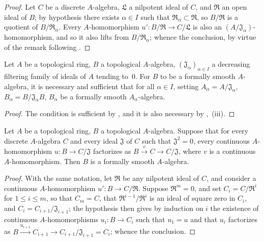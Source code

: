 \begin{proof}
Let $C$ be a discrete $A$-algebra, $\mathfrak{L}$ a nilpotent ideal of $C$, and $\mathfrak{R}$ an open ideal of $B$;
by hypothesis there exists $\alpha\in I$ such that $\mathfrak{R}_\alpha\subset\mathfrak{R}$, so $B/\mathfrak{R}$ is a quotient of $B/\mathfrak{R}_\alpha$.
Every $A$-homomorphism $u':B/\mathfrak{R}\to C/\mathfrak{L}$ is also an $(A/\mathfrak{J}_\alpha)$-homomorphism, and so it also lifts from $B/\mathfrak{R}_\alpha$;
whence the conclusion, by virtue of the remark following .
\end{proof}

\begin{corollary}[19.4.2]
\label{0.19.4.2}
Let $A$ be a topological ring, $B$ a topological $A$-algebra, $(\mathfrak{J}_\alpha)_{\alpha\in I}$ a decreasing filtering family of ideals of $A$ tending to~$0$.
For $B$ to be a formally smooth $A$-algebra, it is necessary and sufficient that for all $\alpha\in I$, setting $A_\alpha=A/\mathfrak{J}_\alpha$, $B_\alpha=B/\mathfrak{J}_\alpha B$, $B_\alpha$ be a formally smooth $A_\alpha$-algebra.
\end{corollary}

\begin{proof}
The condition is sufficient by , and it is also necessary by ,~(iii).
\end{proof}

\begin{proposition}[19.4.3]
\label{0.19.4.3}
Let $A$ be a topological ring, $B$ a topological $A$-algebra.
Suppose that for every discrete $A$-algebra $C$ and every ideal $\mathfrak{J}$ of $C$ such that $\mathfrak{J}^2=0$, every continuous $A$-homomorphism $u:B\to C/\mathfrak{J}$ factorizes as $B\xrightarrow{v}C\to C/\mathfrak{J}$, where $v$ is a continuous $A$-homomorphism.
Then $B$ is a formally smooth $A$-algebra.
\end{proposition}

\begin{proof}
With the same notation, let $\mathfrak{R}$ be any nilpotent ideal of $C$,
and consider a continuous $A$-homomorphism $u':B\to C/\mathfrak{R}$.
Suppose $\mathfrak{R}^m=0$, and set $C_i=C/\mathfrak{R}^i$ for $1\leq i\leq m$, so that $C_m=C$, that $\mathfrak{R}^{i-1}/\mathfrak{R}^i$ is an ideal of square zero in $C_i$, and $C_i=C_{i+1}/\mathfrak{J}_{i+1}$;
the hypothesis then gives by induction on $i$ the existence of continuous $A$-homomorphisms $u_i:B\to C_i$ such that $u_1=u$ and that $u_i$ factorizes as $B\xrightarrow{u_{i+1}}C_{i+1}\to C_{i+1}/\mathfrak{J}_{i+1}=C_i$;
whence the conclusion.
\end{proof}

